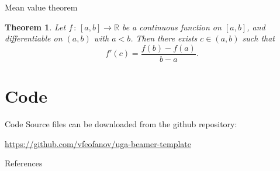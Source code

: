 \documentclass{beamer}
\newtheorem{thm}{Theorem}[section]
\begin{document}
\begin{frame}{Mean value theorem}
\begin{thm}
Let  $f\,:\,[a,b]\to \mathbb{R}$ be a continuous function on $[a,b]$, and differentiable on $(a,b)$ with $a<b$. Then there exists $c\in (a,b)$ such that
\[
f'(c) = \frac{f(b)-f(a)}{b-a}.
\]
\end{thm}
\end{frame}


\section{Code}
\begin{frame}{Code}
    Source files can be downloaded from the github repository:
    \begin{center}
        \url{https://github.com/vfeofanov/uga-beamer-template}
    \end{center}
\end{frame}


\begin{frame}{References}


\end{frame}
\end{document}
